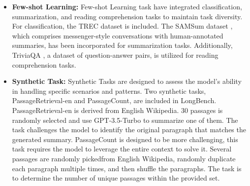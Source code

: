 \begin{itemize}
	
	\item \textbf{Few-shot Learning:} Few-shot Learning task have integrated classification, summarization, and reading comprehension tasks to maintain task diversity. For classification, the TREC dataset \citep{li2002learning} is included. The SAMSum dataset \citep{gliwa2019samsum}, which comprises messenger-style conversations with human-annotated summaries, has been incorporated for summarization tasks. Additionally, TriviaQA \citep{joshi2017triviaqa}, a dataset of question-answer pairs, is utilized for reading comprehension tasks.
	
	
	
	
	
	
	\item \textbf{Synthetic Task:} Synthetic Tasks are designed to assess the model's ability in handling specific scenarios and patterns. Two synthetic tasks, PassageRetrieval-en and PassageCount, are included in LongBench. PassageRetrieval-en is derived from English Wikipedia. 30 passages is randomly selected and use GPT-3.5-Turbo to summarize one of them. The task challenges the model to identify the original paragraph that matches the generated summary. PassageCount is designed to be more challenging, this task requires the model to leverage the entire context to solve it. Several passages are randomly pickedfrom English Wikipedia, randomly duplicate each paragraph multiple times, and then shuffle the paragraphs. The task is to determine the number of unique passages within the provided set.
	
	
	
	

\end{itemize}
